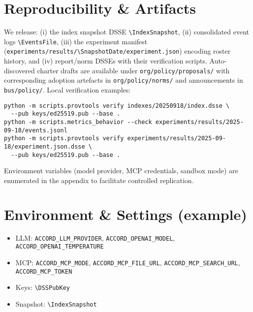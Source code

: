\documentclass[11pt]{article}
\newcommand{\SnapshotDate}{2025-09-18} %
\newcommand{\IndexSnapshot}{indexes/\SnapshotDate/index.dsse}
\newcommand{\EventsFile}{experiments/results/\SnapshotDate/events.jsonl}
\newcommand{\DSSPubKey}{keys/ed25519.pub}
\begin{document}
\section{Reproducibility \& Artifacts}
We release: (i) the index snapshot DSSE \verb|\IndexSnapshot|, (ii) consolidated event logs \verb|\EventsFile|, (iii) the experiment manifest (\verb|experiments/results/\SnapshotDate/experiment.json|) encoding roster history, and (iv) report/norm DSSEs with their verification scripts. Auto-discovered charter drafts are available under \verb|org/policy/proposals/| with corresponding adoption artefacts in \verb|org/policy/norms/| and announcements in \verb|bus/policy/|. Local verification examples:
\begin{verbatim}
python -m scripts.provtools verify indexes/20250918/index.dsse \
  --pub keys/ed25519.pub --base .
python -m scripts.metrics_behavior --check experiments/results/2025-09-18/events.jsonl
python -m scripts.provtools verify experiments/results/2025-09-18/experiment.json.dsse \
  --pub keys/ed25519.pub --base .
\end{verbatim}
Environment variables (model provider, MCP credentials, sandbox mode) are enumerated in the appendix to facilitate controlled replication.

\appendix
\section{Environment \& Settings (example)}
\begin{itemize}[leftmargin=1.2em]
  \item LLM: \verb|ACCORD_LLM_PROVIDER|, \verb|ACCORD_OPENAI_MODEL|, \verb|ACCORD_OPENAI_TEMPERATURE|
  \item MCP: \verb|ACCORD_MCP_MODE|, \verb|ACCORD_MCP_FILE_URL|, \verb|ACCORD_MCP_SEARCH_URL|, \verb|ACCORD_MCP_TOKEN|
  \item Keys: \verb|\DSSPubKey|
  \item Snapshot: \verb|\IndexSnapshot|
\end{itemize}
\end{document}
